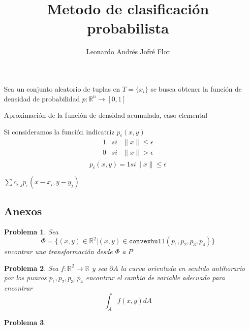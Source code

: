 \documentclass{article}
\author{Leonardo Andrés Jofré Flor}
\title{Metodo de clasificación probabilista}
\newtheorem{problema}{Problema}
\begin{document}
Sea un conjunto aleatorio de tuplas en $T=\{x_i\}$ se busca obtener la función
de densidad de probabilidad $p:\mathbb{R}^n\to[0,1]$

Aproximación de la función de densidad acumulada, caso elemental






Si consideramos la función indicatriz
$p_\epsilon(x,y)$
\begin{eqnarray*}
1 &si& \|x\|\leq \epsilon\\
0 &si& \|x\| > \epsilon\\
\end{eqnarray*}
$$p_\epsilon(x,y)=1 si \|x\|\le \epsilon$$

$\sum c_{i,j}p_\epsilon(x-x_i,y-y_j)$






\subsection{Anexos}

\begin{problema}
	Sea $$\Phi = \{(x,y)\in \mathbb{R}^2| (x,y) \in
	\texttt{convexhull}\left(p_1,p_2,p_3,p_4 \right) \}$$ encontrar una transformación desde $\Phi$ a $P$
	
\end{problema}

\begin{problema}
	Sea $f:\mathbb{R}^2\to\mathbb{R}$ y sea $\partial A$ la curva orientada en
	sentido antihorario por los punros $p_1,p_2,p_3,p_4$ encontrar el cambio de
	variable adecuado para encontrar
	$$\int_A f(x,y)dA$$
\end{problema}

\begin{problema}
	  
\end{problema}
\end{document}
